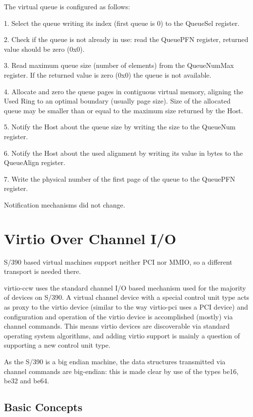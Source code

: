 The virtual queue is configured as follows:

1. Select the queue writing its index (first queue is 0) to the
   QueueSel register.

2. Check if the queue is not already in use: read the QueuePFN
   register, returned value should be zero (0x0).

3. Read maximum queue size (number of elements) from the
   QueueNumMax register. If the returned value is zero (0x0) the
   queue is not available.

4. Allocate and zero the queue pages in contiguous virtual
   memory, aligning the Used Ring to an optimal boundary (usually
   page size). Size of the allocated queue may be smaller than or
   equal to the maximum size returned by the Host.

5. Notify the Host about the queue size by writing the size to
   the QueueNum register.

6. Notify the Host about the used alignment by writing its value
   in bytes to the QueueAlign register.

7. Write the physical number of the first page of the queue to
   the QueuePFN register.

Notification mechanisms did not change.

\section{Virtio Over Channel I/O}\label{sec:Virtio Transport Options / Virtio Over Channel I/O}

S/390 based virtual machines support neither PCI nor MMIO, so a
different transport is needed there.

virtio-ccw uses the standard channel I/O based mechanism used for
the majority of devices on S/390. A virtual channel device with a
special control unit type acts as proxy to the virtio device
(similar to the way virtio-pci uses a PCI device) and
configuration and operation of the virtio device is accomplished
(mostly) via channel commands. This means virtio devices are
discoverable via standard operating system algorithms, and adding
virtio support is mainly a question of supporting a new control
unit type.

As the S/390 is a big endian machine, the data structures transmitted
via channel commands are big-endian: this is made clear by use of
the types be16, be32 and be64.

\subsection{Basic Concepts}\label{sec:Virtio Transport Options / Virtio over channel I/O / Basic Concepts}

